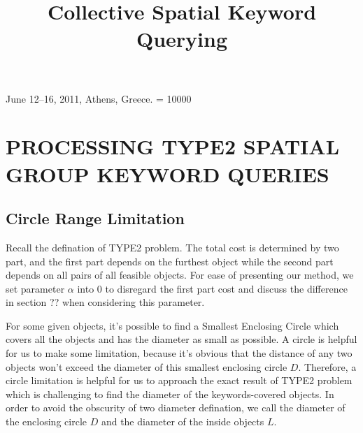 \documentclass{sig-alternate}
\begin{document}
 {June 12--16, 2011, Athens, Greece.}
\widowpenalty = 10000
%

\title{Collective Spatial Keyword Querying}
%
%



\maketitle


\section{PROCESSING TYPE2 SPATIAL GROUP KEYWORD QUERIES} \label{sec:type2}
\subsection{Circle Range Limitation} \label{secsub:type2:limitation}
Recall the defination of \textsf{TYPE2} problem. The total cost is determined
by two part, and the first part depends on the furthest object while
the second part depends on all pairs of all feasible objects.
For ease of presenting our method, we set parameter $\alpha$ into 0
to disregard the first part cost and discuss the difference
in section ?? when considering this parameter.\par
%
For some given objects, it's possible to find a \textsf{Smallest Enclosing Circle}
which covers all the objects and has the diameter as small as possible. A circle is
helpful for us to make some limitation, because it's obvious that the distance of
any two objects won't exceed the diameter of this smallest enclosing circle $D$.
Therefore, a circle limitation is helpful for us to approach the exact result
of \textsf{TYPE2} problem which is challenging to find the diameter of the keywords-covered
objects. In order to avoid the obscurity of two diameter defination, we call the
diameter of the enclosing circle $D$ and the diameter of the inside objects $L$.\par
%
\end{document}
